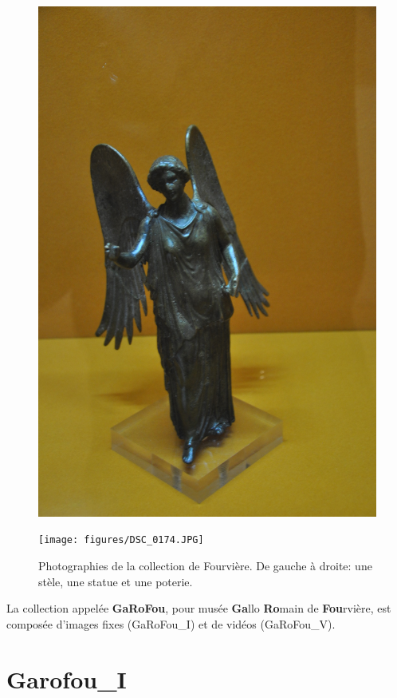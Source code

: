 \begin{figure}[htb]
\begin{minipage}[c]{.2\linewidth}
      \includegraphics[width=\linewidth]{figures/A_019_00.jpg}
   \end{minipage}
   \begin{minipage}[c]{.2\linewidth}
      \texttt{[image: figures/DSC\_0174.JPG]}
   \end{minipage}
    \caption{Photographies de la collection de Fourvière. De gauche à droite: une stèle, une statue et une poterie.}
  	\label{fig:exempleFourviere}
\end{figure}

La collection appelée {\bf GaRoFou}, pour musée {\bf Ga}llo {\bf Ro}main de {\bf Fou}rvière, est composée d'images fixes (GaRoFou\_I) et de vidéos (GaRoFou\_V).

\section{Garofou\_I}
\label{sec:garoufoui}

